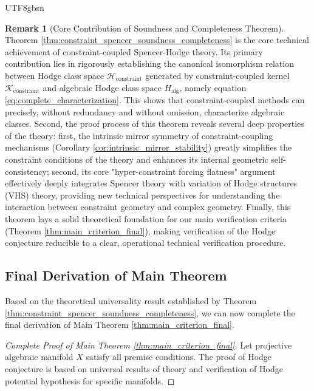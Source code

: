 \documentclass[a4paper,12pt]{extarticle}
\theoremstyle{definition}
\newtheorem{remark}{Remark}[section]
\begin{document}
\begin{CJK}{UTF8}{gbsn}
\begin{remark}[Core Contribution of Soundness and Completeness Theorem]
\label{rem:soundness_completeness_contribution}
Theorem \ref{thm:constraint_spencer_soundness_completeness} is the core technical achievement of constraint-coupled Spencer-Hodge theory. Its primary contribution lies in rigorously establishing the canonical isomorphism relation between Hodge class space $\mathcal{H}_{\text{constraint}}$ generated by constraint-coupled kernel $\mathcal{K}_{\text{constraint}}$ and algebraic Hodge class space $H_{\text{alg}}$, namely equation \eqref{eq:complete_characterization}. This shows that constraint-coupled methods can precisely, without redundancy and without omission, characterize algebraic classes. Second, the proof process of this theorem reveals several deep properties of the theory: first, the intrinsic mirror symmetry of constraint-coupling mechanisms (Corollary \ref{cor:intrinsic_mirror_stability}) greatly simplifies the constraint conditions of the theory and enhances its internal geometric self-consistency; second, its core "hyper-constraint forcing flatness" argument effectively deeply integrates Spencer theory with variation of Hodge structures (VHS) theory, providing new technical perspectives for understanding the interaction between constraint geometry and complex geometry. Finally, this theorem lays a solid theoretical foundation for our main verification criteria (Theorem \ref{thm:main_criterion_final}), making verification of the Hodge conjecture reducible to a clear, operational technical verification procedure.
\end{remark}

\subsection{Final Derivation of Main Theorem}
\label{subsec:final_derivation_main_theorem}

Based on the theoretical universality result established by Theorem \ref{thm:constraint_spencer_soundness_completeness}, we can now complete the final derivation of Main Theorem \ref{thm:main_criterion_final}.

\begin{proof}[Complete Proof of Main Theorem \ref{thm:main_criterion_final}]
Let projective algebraic manifold $X$ satisfy all premise conditions. The proof of Hodge conjecture is based on universal results of theory and verification of Hodge potential hypothesis for specific manifolds.


\end{proof}
\end{CJK}
\end{document}
